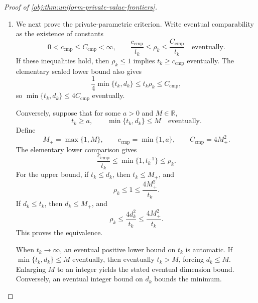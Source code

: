 \documentclass[11pt]{article}
\begin{document}
\begin{proof}[Proof of \cref{obj:thm:uniform-private-value-frontiers}]
\begin{enumerate}
Suppose \(\rho_k\to0\). The elementary lower comparison forces \(t_k\to\infty\): for any real threshold \(M_{\mathrm{test}}\), if
\(t_k<M_{\mathrm{test}}\), then
\[
\rho_k\ge
\min\{1,t_k^{-1}\}
\ge\frac1{\max\{M_{\mathrm{test}},1\}}>0.
\]
Such indices are eventually excluded by convergence to zero.
Eventually \(\rho_k<1\), and the first numerical inequality gives
\[
0\le g_k\le\sqrt{\rho_k}\longrightarrow0.
\]

Conversely, suppose \(t_k\to\infty\) and \(g_k\to0\). Fix a tolerance
\(\zeta>0\), and define
\[
q_{\mathrm{cons}}=\frac{\sqrt{\zeta}}4.
\]
Choose an integer \(D_{\mathrm{cons}}\) such that, for every
\(d\ge D_{\mathrm{cons}}\),
\[
e_{\mathrm{corr}}(d)<q_{\mathrm{cons}},
\qquad
\frac1{\log(ed)}<q_{\mathrm{cons}}.
\]
Eventually,
\[
g_k<q_{\mathrm{cons}},
\qquad
t_k\ge\frac{4D_{\mathrm{cons}}^2}{\zeta}+1.
\]
If \(d_k\ge D_{\mathrm{cons}}\), the numerical upper bound gives
\[
\rho_k<(2q_{\mathrm{cons}})^2+q_{\mathrm{cons}}^2
=\frac{5\zeta}{16}<\zeta.
\]
If \(d_k<D_{\mathrm{cons}}\), the elementary comparison gives
\[
\rho_k\le\frac{4d_k^2}{t_k}
\le\frac{4D_{\mathrm{cons}}^2}{t_k}<\zeta.
\]
Thus \(\rho_k\to0\), establishing the criterion for arbitrary allowed sequences.

\item
We next prove the private-parametric criterion. Write eventual comparability as the existence of constants
\[
0<c_{\mathrm{cmp}}\le C_{\mathrm{cmp}}<\infty,
\qquad
\frac{c_{\mathrm{cmp}}}{t_k}\le\rho_k
\le\frac{C_{\mathrm{cmp}}}{t_k}
\quad\text{eventually}.
\]
If these inequalities hold, then \(\rho_k\le1\) implies
\(t_k\ge c_{\mathrm{cmp}}\) eventually. The elementary scaled lower bound also gives
\[
\frac14\min\{t_k,d_k\}\le t_k\rho_k\le C_{\mathrm{cmp}},
\]
so \(\min\{t_k,d_k\}\le4C_{\mathrm{cmp}}\) eventually.

Conversely, suppose that for some \(a>0\) and \(M\in\mathbb R\),
\[
t_k\ge a,\qquad \min\{t_k,d_k\}\le M
\quad\text{eventually}.
\]
Define
\[
M_+=\max\{1,M\},\qquad
c_{\mathrm{cmp}}=\min\{1,a\},\qquad
C_{\mathrm{cmp}}=4M_+^2.
\]
The elementary lower comparison gives
\[
\frac{c_{\mathrm{cmp}}}{t_k}
\le\min\{1,t_k^{-1}\}\le\rho_k.
\]
For the upper bound, if \(t_k\le d_k\), then \(t_k\le M_+\), and
\[
\rho_k\le1\le\frac{4M_+^2}{t_k}.
\]
If \(d_k\le t_k\), then \(d_k\le M_+\), and
\[
\rho_k\le\frac{4d_k^2}{t_k}
\le\frac{4M_+^2}{t_k}.
\]
This proves the equivalence.

When \(t_k\to\infty\), an eventual positive lower bound on \(t_k\) is automatic. If \(\min\{t_k,d_k\}\le M\) eventually, then eventually \(t_k>M\), forcing \(d_k\le M\). Enlarging \(M\) to an integer yields the stated eventual dimension bound. Conversely, an eventual integer bound on \(d_k\) bounds the minimum.


\end{enumerate}
\end{proof}
\end{document}
